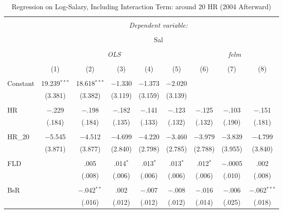 
\begin{table}[H] \centering
  \caption{Regression on Log-Salary, Including Interaction Term: around 20 HR (2004 Afterward)} 
  \label{HR20_D}
\tiny
\begin{tabular}{@{\extracolsep{5pt}}lcccccccc}
\\[-1.8ex]\hline
\hline \\[-1.8ex]
 & \multicolumn{8}{c}{\textit{Dependent variable:}} \\
\cline{2-9}
\\[-1.8ex] & \multicolumn{8}{c}{Sal} \\
\\[-1.8ex] & \multicolumn{5}{c}{\textit{OLS}} & \multicolumn{3}{c}{\textit{felm}} \\
\\[-1.8ex] & (1) & (2) & (3) & (4) & (5) & (6) & (7) & (8)\\
\hline \\[-1.8ex]
 Constant & 19.239$^{***}$ & 18.618$^{***}$ & $-$1.330 & $-$1.373 & $-$2.020 &  &  &  \\
  & (3.381) & (3.382) & (3.119) & (3.159) & (3.139) &  &  &  \\
  & & & & & & & & \\
 HR & $-$.229 & $-$.198 & $-$.182 & $-$.141 & $-$.123 & $-$.125 & $-$.103 & $-$.151 \\
  & (.184) & (.184) & (.135) & (.133) & (.132) & (.132) & (.190) & (.181) \\
  & & & & & & & & \\
 HR\_20 & $-$5.545 & $-$4.512 & $-$4.699 & $-$4.220 & $-$3.460 & $-$3.979 & $-$3.839 & $-$4.799 \\
  & (3.871) & (3.877) & (2.840) & (2.798) & (2.785) & (2.788) & (3.955) & (3.840) \\
  & & & & & & & & \\
 FLD &  & .005 & .014$^{*}$ & .013$^{*}$ & .013$^{*}$ & .012$^{*}$ & $-$.0005 & .002 \\
  &  & (.008) & (.006) & (.006) & (.006) & (.006) & (.010) & (.008) \\
  & & & & & & & & \\
 BsR &  & $-$.042$^{**}$ & .002 & $-$.007 & $-$.008 & $-$.016 & $-$.006 & $-$.062$^{***}$ \\
  &  & (.016) & (.012) & (.012) & (.012) & (.014) & (.025) & (.018) \\

\end{tabular}
\end{table}
